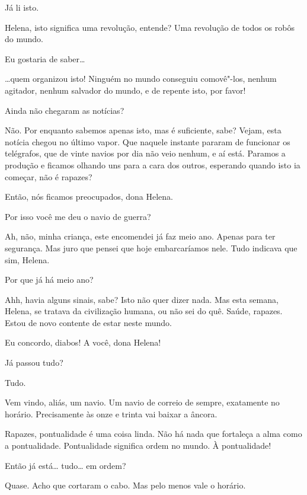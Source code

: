  Já li isto.

  Helena, isto significa uma revolução, entende? 
Uma revolução de todos os robôs do mundo.

 Eu gostaria de saber\ldots{}

  \ldots{}quem organizou isto! Ninguém no mundo conseguiu
comovê"-los, nenhum agitador, nenhum salvador do mundo, e de repente isto, por favor!

 Ainda não chegaram as notícias?

 Não. Por enquanto sabemos apenas isto, mas é suficiente, sabe? Vejam,
esta notícia chegou no último vapor. Que naquele instante pararam de
funcionar os telégrafos, que de vinte navios por dia não veio nenhum, e aí está.
Paramos a produção e ficamos olhando uns para a cara dos outros, esperando quando isto ia começar,
não é rapazes?

 Então, nós ficamos preocupados, dona Helena.

 Por isso você me deu o navio de guerra?

 Ah, não, minha criança, este encomendei já faz meio ano. Apenas para ter
segurança. Mas juro que pensei que hoje embarcaríamos nele. Tudo indicava que sim,
Helena.

 Por que já há meio ano?

 Ahh, havia alguns sinais, sabe? Isto não quer dizer nada. Mas esta
semana, Helena, se tratava da civilização humana, ou não sei do quê. Saúde,
rapazes. Estou de novo contente de estar neste mundo.

 Eu concordo, diabos! A você, dona Helena! 

 Já passou tudo?

 Tudo.

 Vem vindo, aliás, um navio. Um navio de correio de sempre, exatamente
no horário. Precisamente às onze e trinta vai baixar a âncora.

 Rapazes, pontualidade é uma coisa linda. Não há nada que fortaleça a alma
como a pontualidade. Pontualidade significa ordem no mundo.  À
pontualidade!

 Então já está\ldots{} tudo\ldots{} em ordem?

 Quase. Acho que cortaram o cabo. Mas pelo menos vale o horário.

